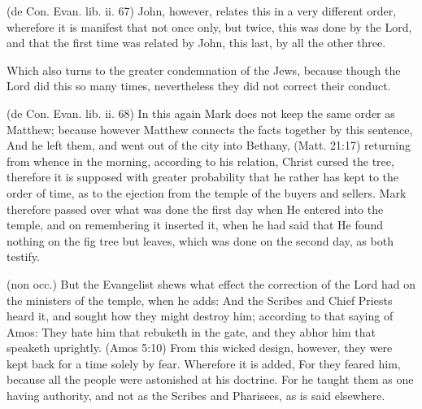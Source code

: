  (de Con. Evan. lib. ii. 67) John, however, relates this in a very different order, wherefore it is manifest that not once only, but twice, this was done by the Lord, and that the first time was related by John, this last, by all the other three.

 Which also turns to the greater condemnation of the Jews, because though the Lord did this so many times, nevertheless they did not correct their conduct.

 (de Con. Evan. lib. ii. 68) In this again Mark does not keep the same order as Matthew; because however Matthew connects the facts together by this sentence, And he left them, and went out of the city into Bethany, (Matt. 21:17) returning from whence in the morning, according to his relation, Christ cursed the tree, therefore it is supposed with greater probability that he rather has kept to the order of time, as to the ejection from the temple of the buyers and sellers. Mark therefore passed over what was done the first day when He entered into the temple, and on remembering it inserted it, when he had said that He found nothing on the fig tree but leaves, which was done on the second day, as both testify.

 (non occ.) But the Evangelist shews what effect the correction of the Lord had on the ministers of the temple, when he adds: And the Scribes and Chief Priests heard it, and sought how they might destroy him; according to that saying of Amos: They hate him that rebuketh in the gate, and they abhor him that speaketh uprightly. (Amos 5:10) From this wicked design, however, they were kept back for a time solely by fear. Wherefore it is added, For they feared him, because all the people were astonished at his doctrine. For he taught them as one having authority, and not as the Scribes and Pharisees, as is said elsewhere.

 

